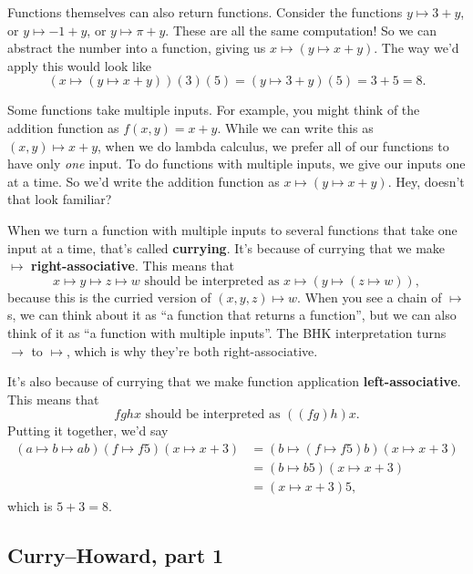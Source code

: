 \documentclass[11pt,paper=letter]{scrartcl}
\begin{document}
Functions themselves can also return functions. Consider the functions $y \mapsto 3 + y$, or $y \mapsto -1 + y$, or $y \mapsto \pi + y$. These are all the same computation! So we can abstract the number into a function, giving us $x \mapsto (y \mapsto x + y)$. The way we'd apply this would look like \[
  (x \mapsto (y \mapsto x + y))(3)(5)
  = (y \mapsto 3 + y)(5)
  = 3 + 5
  = 8.
\]

Some functions take multiple inputs. For example, you might think of the addition function as $f(x, y) = x + y$. While we can write this as $(x, y) \mapsto x + y$, when we do lambda calculus, we prefer all of our functions to have only \emph{one} input. To do functions with multiple inputs, we give our inputs one at a time. So we'd write the addition function as $x \mapsto (y \mapsto x + y)$. Hey, doesn't that look familiar?

When we turn a function with multiple inputs to several functions that take one input at a time, that's called \textbf{currying}. It's because of currying that we make $\mapsto$ \textbf{right-associative}. This means that \[
  x \mapsto y \mapsto z \mapsto w
  \text{ should be interpreted as }
  x \mapsto (y \mapsto (z \mapsto w)),
\]
because this is the curried version of $(x, y, z) \mapsto w$. When you see a chain of $\mapsto$s, we can think about it as ``a function that returns a function'', but we can also think of it as ``a function with multiple inputs''. The BHK interpretation turns $\to$ to $\mapsto$, which is why they're both right-associative.

It's also because of currying that we make function application \textbf{left-associative}. This means that \[
  fghx \text{ should be interpreted as } ((fg)h)x.
\]
Putting it together, we'd say
\begin{align*}
(a \mapsto b \mapsto ab)(f \mapsto f5)(x \mapsto x + 3)
&= (b \mapsto (f \mapsto f5)b)(x \mapsto x + 3) \\
&= (b \mapsto b5)(x \mapsto x + 3)\\
&= (x \mapsto x + 3)5,
\end{align*}
which is $5 + 3 = 8$.

\subsection{Curry--Howard, part 1}
\end{document}
